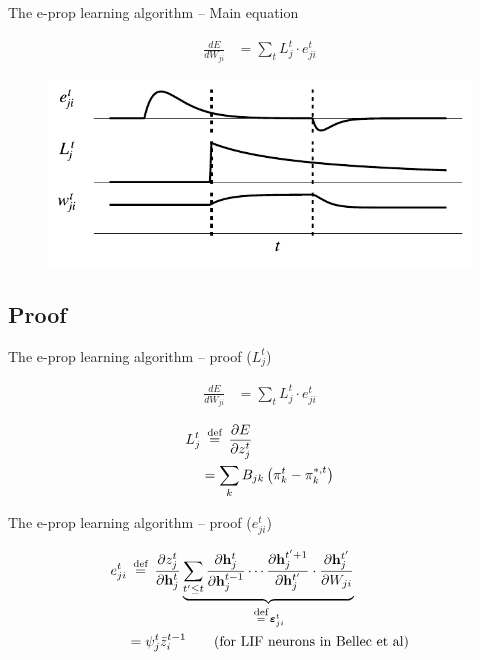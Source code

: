 \documentclass[t]{beamer}
\newcommand\eqdef{\ \mathrel{\overset{\makebox[0pt]{\mbox{\normalfont\scriptsize\rmfamily def}}}{=}}\ }
\begin{document}
\begin{frame}{The e-prop learning algorithm -- Main equation}
	
	\begin{align*}
		\frac{dE}{dW_{ji}} 
		&= \sum_tL_j^t \cdot e_{ji}^t
	\end{align*}
	
	\begin{figure}[!ht]
		\includegraphics[width=0.8\linewidth]{eligibility.pdf}
	\end{figure}
	
\end{frame}

\subsection{Proof}
\begin{frame}{The e-prop learning algorithm -- proof ($L^t_j$)}
	
	\begin{align*}
		\frac{dE}{dW_{ji}} 
		&= \sum_tL_j^t \cdot e_{ji}^t
	\end{align*}
	
	\begin{align*}
L^t_j &\eqdef \frac{\partial E}{\partial z^t_j}\\ &= \sum_kB_{jk}\left(\pi^t_k-\pi_k^{*,t}\right)
\end{align*}
	
	
\end{frame}

\begin{frame}{The e-prop learning algorithm -- proof ($e^t_{ji}$)}

	\begin{align*}
e^t_{ji} &\eqdef \frac{\partial z_j^t}{\partial\mathbf{h}_j^t}\underbrace{\sum_{t'\leq t}\frac{\partial\mathbf{h}^t_j}{\partial\mathbf{h}_j^{t-1}} \cdots \frac{\partial\mathbf{h}_j^{t'+1}}{\partial\mathbf{h}_j^{t'}}\cdot\frac{\partial\mathbf{h}_j^{t'}}{\partial W_{ji}}}_{\eqdef \bm{\varepsilon}_{ji}^t}\\
&= \psi_j^t\bar{z}^{t-1}_i\qquad\text{(for LIF neurons in Bellec et al)}
\end{align*}
	
	
\end{frame}
\end{document}
